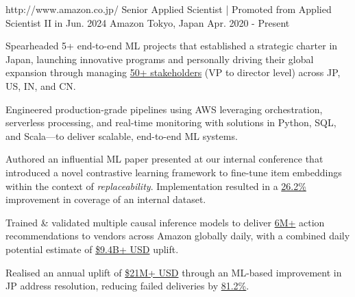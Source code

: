 

\begin{cventries}

  \cventry
    {http://www.amazon.co.jp/}
    {Senior Applied Scientist | Promoted from Applied Scientist II in Jun. 2024} %
    {Amazon} %
    {Tokyo, Japan} %
    {Apr. 2020 - Present} %
    {
      \begin{cvitems} %
        \item {Spearheaded 5+ end-to-end ML projects that established a strategic charter in Japan, launching innovative programs and personally driving their global expansion through managing \underline{50+ stakeholders} (VP to director level) across JP, US, IN, and CN.}
        \item {Engineered production-grade pipelines using AWS leveraging orchestration, serverless processing, and real-time monitoring with solutions in Python, SQL, and Scala—to deliver scalable, end-to-end ML systems.}
        \item {Authored an influential ML paper presented at our internal conference that introduced a novel contrastive learning framework to fine-tune item embeddings within the context of \textit{replaceability}. Implementation resulted in a \underline{26.2\%} improvement in coverage of an internal dataset.}
        \item {Trained \& validated multiple causal inference models to deliver \underline{6M+} action recommendations to vendors across Amazon globally daily, with a combined daily potential estimate of \underline{\$9.4B+ USD} uplift.}
        \item {Realised an annual uplift of \underline{\$21M+ USD} through an ML-based improvement in JP address resolution, reducing failed deliveries by \underline{81.2\%}.}
      \end{cvitems}
    }



\end{cventries}
